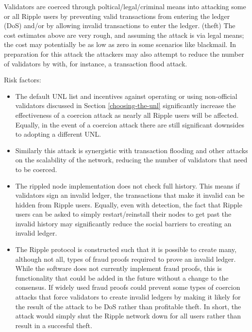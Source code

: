 \documentclass{article}
\begin{document}
Validators are coerced through poltical/legal/criminal means into attacking
some or all Ripple users by preventing valid transactions from entering the
ledger (DoS) and/or by allowing invalid transactions to enter the ledger.
(theft) The cost estimates above are very rough, and assuming the attack is via
legal means; the cost may potentially be as low as zero in some scenarios like
blackmail. In preparation for this attack the attackers may also attempt to
reduce the number of validators by with, for instance, a transaction flood
attack.

Risk factors:

\begin{itemize}

    \item The default UNL list and incentives against operating or using
        non-official validators discussed in Section \ref{choosing-the-unl}
        significantly increase the effectiveness of a coercion attack as nearly
        all Ripple users will be affected. Equally, in the event of a coercion
        attack there are still significant downsides to adopting a different
        UNL.

    \item Similarly this attack is synergistic with transaction flooding and
        other attacks on the scalability of the network, reducing the number of
        validators that need to be coerced.

    \item The rippled node implementation does not check full history. This
        means if validators sign an invalid ledger, the transactions that make
        it invalid can be hidden from Ripple users. Equally, even with
        detection, the fact that Ripple users can be asked to simply
        restart/reinstall their nodes to get past the invalid history may
        significantly reduce the social barriers to creating an invalid ledger.

    \item The Ripple protocol is constructed such that it is possible to create
        many, although not all, types of fraud
        proofs\cite{irc-btcdev-gmaxwell-fraud-proof, btctalk-pkt-fraud-proofs}
        required to prove an invalid ledger. While the software does not
        currently implement fraud proofs, this is functionality that could be
        added in the future without a change to the consensus. If widely used
        fraud proofs could prevent some types of coercion attacks that force
        validators to create invalid ledgers by making it likely for the result
        of the attack to be DoS rather than profitable theft. In short, the
        attack would simply shut the Ripple network down for all users rather
        than result in a succesful theft.


\end{itemize}
\end{document}
